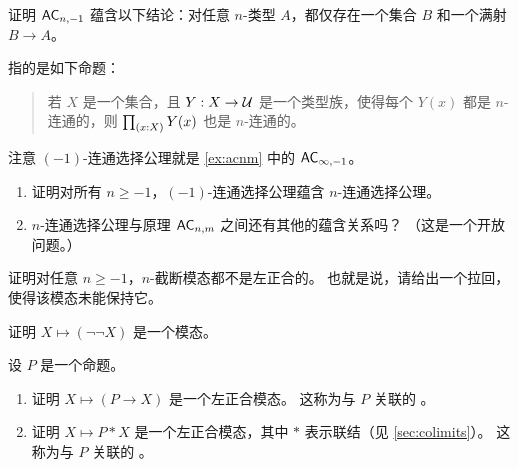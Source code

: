 \begin{ex}\label{ex:acnm-surjset}
  证明 $\mathsf{AC}_{n,-1}$ 蕴含以下结论：对任意 $n$-类型 $A$，都仅存在一个集合 $B$ 和一个满射 $B\to A$。
\end{ex}

\begin{ex}\label{ex:acconn}
  指的是如下命题：
  \begin{quote}
    若 $X$ 是一个集合，且 $Y:X\to \mathcal{U}$ 是一个类型族，使得每个 $Y(x)$ 都是 $n$-连通的，则 $\prd{x:X} Y(x)$ 也是 $n$-连通的。
  \end{quote}
  注意 $(-1)$-连通选择公理就是 \cref{ex:acnm} 中的 $\mathsf{AC}_{\infty,-1}$。
  \begin{enumerate}
  \item 证明对所有 $n\ge -1$，$(-1)$-连通选择公理蕴含 $n$-连通选择公理。
  \item $n$-连通选择公理与原理 $\mathsf{AC}_{n,m}$ 之间还有其他的蕴含关系吗？
    （这是一个开放问题。）
  \end{enumerate}
\end{ex}

\begin{ex}\label{ex:n-truncation-not-left-exact}
  证明对任意 $n\ge -1$，$n$-截断模态都不是左正合的。
  也就是说，请给出一个拉回，使得该模态未能保持它。
\end{ex}

\begin{ex}\label{ex:double-negation-modality}
  证明 $X\mapsto (\neg\neg X)$ 是一个模态。%
\end{ex}

\begin{ex}\label{ex:prop-modalities}
  设 $P$ 是一个命题。
  \begin{enumerate}
  \item 证明 $X\mapsto (P\to X)$ 是一个左正合模态。
    这称为与 $P$ 关联的
    。
  \item 证明 $X\mapsto P*X$ 是一个左正合模态，其中 $*$ 表示联结（见 \cref{sec:colimits}）。
    这称为与 $P$ 关联的
    。
  \end{enumerate}
\end{ex}

